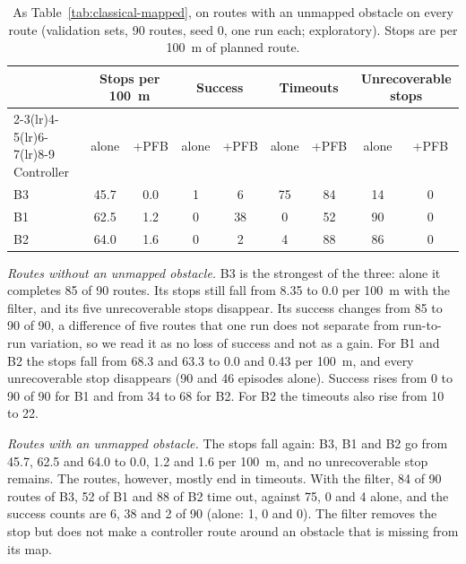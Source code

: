 \begin{table}[t]
\caption{As Table~\ref{tab:classical-mapped}, on routes with an unmapped obstacle on every route (validation sets, 90 routes, seed 0, one run each; exploratory). Stops are per 100~m of planned route.}
\label{tab:classical-unmapped}
\centering
\small
\setlength{\tabcolsep}{4pt}
\begin{tabular}{lcccccccc}
\toprule
 & \multicolumn{2}{c}{Stops per 100~m} & \multicolumn{2}{c}{Success} & \multicolumn{2}{c}{Timeouts} & \multicolumn{2}{c}{Unrecoverable stops} \\
\cmidrule(lr){2-3}\cmidrule(lr){4-5}\cmidrule(lr){6-7}\cmidrule(lr){8-9}
Controller & alone & +PFB & alone & +PFB & alone & +PFB & alone & +PFB \\
\midrule
B3 & 45.7 & 0.0  & 1  & 6  & 75 & 84 & 14 & 0 \\
B1 & 62.5 & 1.2  & 0  & 38 & 0  & 52 & 90 & 0 \\
B2 & 64.0 & 1.6  & 0  & 2  & 4  & 88 & 86 & 0 \\
\bottomrule
\end{tabular}
\end{table}

\emph{Routes without an unmapped obstacle.} B3 is the strongest of the three: alone it completes 85 of 90 routes. Its stops still fall from 8.35 to 0.0 per 100~m with the filter, and its five unrecoverable stops disappear. Its success changes from 85 to 90 of 90, a difference of five routes that one run does not separate from run-to-run variation, so we read it as no loss of success and not as a gain. For B1 and B2 the stops fall from 68.3 and 63.3 to 0.0 and 0.43 per 100~m, and every unrecoverable stop disappears (90 and 46 episodes alone). Success rises from 0 to 90 of 90 for B1 and from 34 to 68 for B2. For B2 the timeouts also rise from 10 to 22.

\emph{Routes with an unmapped obstacle.} The stops fall again: B3, B1 and B2 go from 45.7, 62.5 and 64.0 to 0.0, 1.2 and 1.6 per 100~m, and no unrecoverable stop remains. The routes, however, mostly end in timeouts. With the filter, 84 of 90 routes of B3, 52 of B1 and 88 of B2 time out, against 75, 0 and 4 alone, and the success counts are 6, 38 and 2 of 90 (alone: 1, 0 and 0). The filter removes the stop but does not make a controller route around an obstacle that is missing from its map.

